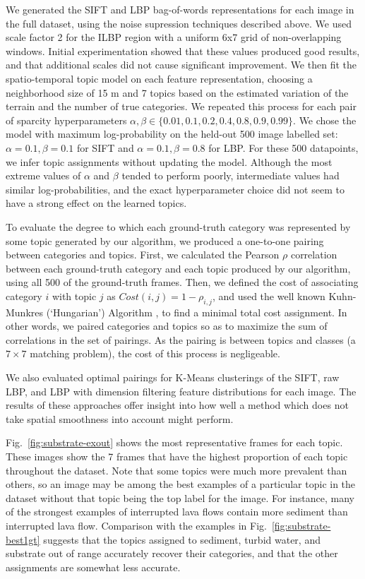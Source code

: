 We generated the SIFT and LBP bag-of-words representations for each image in the full dataset, using the noise supression techniques described above. We used scale factor 2 for the ILBP region with a uniform 6x7 grid of non-overlapping windows. Initial experimentation showed that these values produced good results, and that additional scales did not cause significant improvement. We then fit the spatio-temporal topic model on each feature representation, choosing a neighborhood size of 15 m and 7 topics based on the estimated variation of the terrain and the number of true categories. We repeated this process for each pair of sparcity hyperparameters $\alpha, \beta \in \{0.01, 0.1, 0.2, 0.4, 0.8, 0.9, 0.99\}$. We chose the model with maximum log-probability on the held-out 500 image labelled set: $\alpha = 0.1, \beta = 0.1$ for SIFT and $\alpha = 0.1, \beta = 0.8$ for LBP. For these 500 datapoints, we infer topic assignments without updating the model. Although the most extreme values of $\alpha$ and $\beta$ tended to perform poorly, intermediate values had similar log-probabilities, and the exact hyperparameter choice did not seem to have a strong effect on the learned topics.

To evaluate the degree to which each ground-truth category was represented by some topic generated by our algorithm, we produced a one-to-one pairing between categories and topics. First, we calculated the Pearson $\rho$ correlation between each ground-truth category and each topic produced by our algorithm, using all 500 of the ground-truth frames. Then, we defined the cost of associating category $i$ with topic $j$ as $Cost(i, j) = 1 - \rho_{i,j}$, and used the well known Kuhn-Munkres (`Hungarian') Algorithm \citep{KuhnHungarian}, to find a minimal total cost assignment. In other words, we paired categories and topics so as to maximize the sum of correlations in the set of pairings. As the pairing is between topics and classes (a $7\times7$ matching problem), the cost of this process is negligeable.

We also evaluated optimal pairings for K-Means clusterings of the SIFT, raw LBP, and LBP with dimension filtering feature distributions for each image. The results of these approaches offer insight into how well a method which does not take spatial smoothness into account might perform.

Fig.~\ref{fig:substrate-exout} shows the most representative frames for each topic. These images show the 7 frames that have the highest proportion of each topic throughout the dataset. Note that some topics were much more prevalent than others, so
an image may be among the best examples of a particular topic in the dataset without that topic being the top label for
the image. For instance, many of the strongest examples of interrupted lava flows contain more sediment than interrupted
lava flow. Comparison with the examples in Fig.~\ref{fig:substrate-best1gt} suggests that the topics assigned
to sediment, turbid water, and substrate out of range accurately recover their categories, and that the
other assignments are somewhat less accurate.

